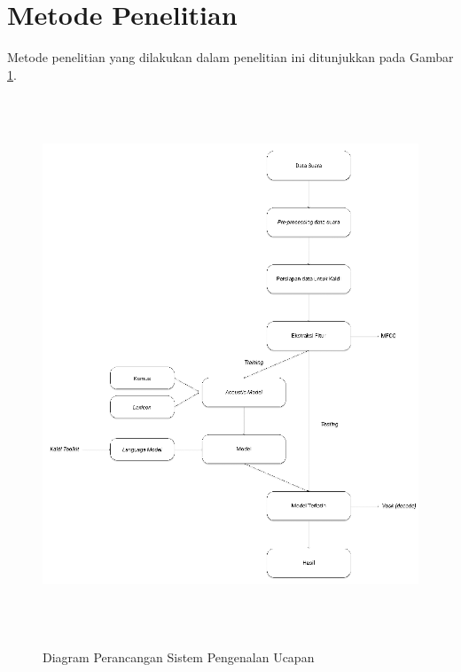 \fancyhf{} 
\fancyfoot[R]{\thepage}

\begin{figure}[H]
\end{figure}

\fancyhf{} 
\fancyfoot[R]{\thepage}

\section{Metode Penelitian}
Metode penelitian yang dilakukan dalam penelitian ini ditunjukkan pada Gambar \ref{sr_perancangan}.

\begin{figure}[H]
\centering
{\includegraphics [width = 14cm, height= 16cm]{gambar/sr_perancangan}}
\caption{Diagram Perancangan Sistem Pengenalan Ucapan}
\label{sr_perancangan}
\end{figure}

